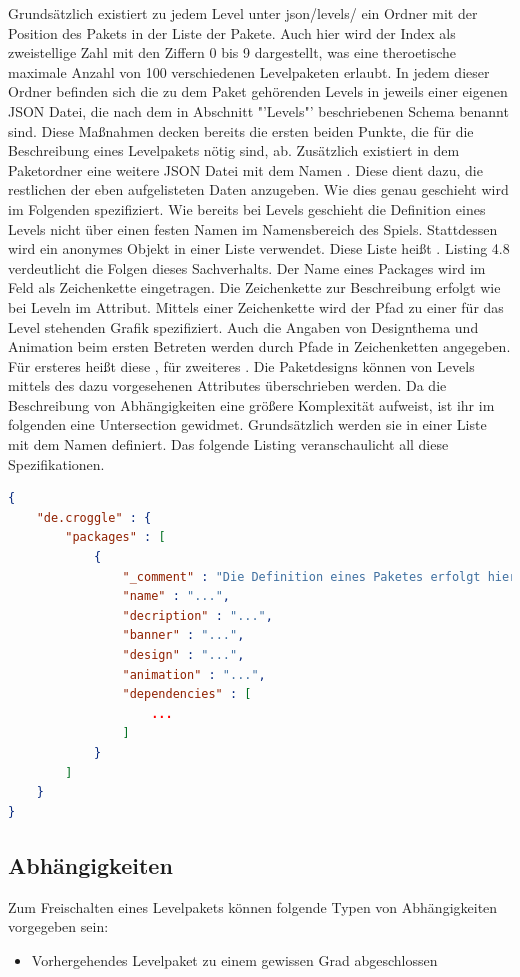 Grundsätzlich existiert zu jedem Level unter json/levels/ ein Ordner mit der Position des Pakets in der Liste der Pakete.
Auch hier wird der Index als zweistellige Zahl mit den Ziffern 0 bis 9 dargestellt, was eine theroetische maximale Anzahl von 100 verschiedenen Levelpaketen erlaubt.
In jedem dieser Ordner befinden sich die zu dem Paket gehörenden Levels in jeweils einer eigenen JSON Datei, die nach dem in Abschnitt "'Levels"' beschriebenen Schema benannt sind.
Diese Maßnahmen decken bereits die ersten beiden Punkte, die für die Beschreibung eines Levelpakets nötig sind, ab.
Zusätzlich existiert in dem Paketordner eine weitere JSON Datei mit dem Namen .
Diese dient dazu, die restlichen der eben aufgelisteten Daten anzugeben.
Wie dies genau geschieht wird im Folgenden spezifiziert.
\newline
Wie bereits bei Levels geschieht die Definition eines Levels nicht über einen festen Namen im Namensbereich des Spiels.
Stattdessen wird ein anonymes Objekt in einer Liste verwendet.
Diese Liste heißt .
Listing 4.8 verdeutlicht die Folgen dieses Sachverhalts.
Der Name eines Packages wird im Feld  als Zeichenkette eingetragen.
Die Zeichenkette zur Beschreibung erfolgt wie bei Leveln im  Attribut.
Mittels einer Zeichenkette  wird der Pfad zu einer für das Level stehenden Grafik spezifiziert.
Auch die Angaben von Designthema und Animation beim ersten Betreten werden durch Pfade in Zeichenketten angegeben.
Für ersteres heißt diese , für zweiteres .
Die Paketdesigns können von Levels mittels des dazu vorgesehenen  Attributes überschrieben werden.
Da die Beschreibung von Abhängigkeiten eine größere Komplexität aufweist, ist ihr im folgenden eine Untersection gewidmet.
Grundsätzlich werden sie in einer Liste mit dem Namen  definiert.
Das folgende Listing veranschaulicht all diese Spezifikationen.
\begin{lstlisting}[language=json,caption={Standardinhalt der Definition eines Levels}]
{
	"de.croggle" : {
		"packages" : [
			{
				"_comment" : "Die Definition eines Paketes erfolgt hier",
				"name" : "...",
				"decription" : "...",
				"banner" : "...",
				"design" : "...",
				"animation" : "...",
				"dependencies" : [
					...
				]
			}
		]
	}
}
\end{lstlisting}

\subsection{Abhängigkeiten}
Zum Freischalten eines Levelpakets können folgende Typen von Abhängigkeiten vorgegeben sein:
\begin{itemize}
	\item Vorhergehendes Levelpaket zu einem gewissen Grad abgeschlossen
\end{itemize}

